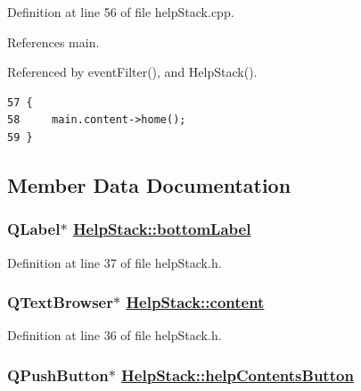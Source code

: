 Definition at line 56 of file help\-Stack.cpp.

References main.

Referenced by event\-Filter(), and Help\-Stack().

\footnotesize\begin{verbatim}57 {
58     main.content->home();
59 }
\end{verbatim}\normalsize 




\subsection{Member Data Documentation}
\hypertarget{classHelpStack_r5}{
\subsubsection[bottomLabel]{\setlength{\rightskip}{0pt plus 5cm}QLabel$\ast$ \hyperlink{classHelpStack_r5}{Help\-Stack::bottom\-Label}}}
\label{classHelpStack_r5}


Definition at line 37 of file help\-Stack.h.\hypertarget{classHelpStack_r4}{
\subsubsection[content]{\setlength{\rightskip}{0pt plus 5cm}QText\-Browser$\ast$ \hyperlink{classHelpStack_r4}{Help\-Stack::content}}}
\label{classHelpStack_r4}


Definition at line 36 of file help\-Stack.h.\hypertarget{classHelpStack_r3}{
\subsubsection[helpContentsButton]{\setlength{\rightskip}{0pt plus 5cm}QPush\-Button$\ast$ \hyperlink{classHelpStack_r3}{Help\-Stack::help\-Contents\-Button}}}
\label{classHelpStack_r3}


